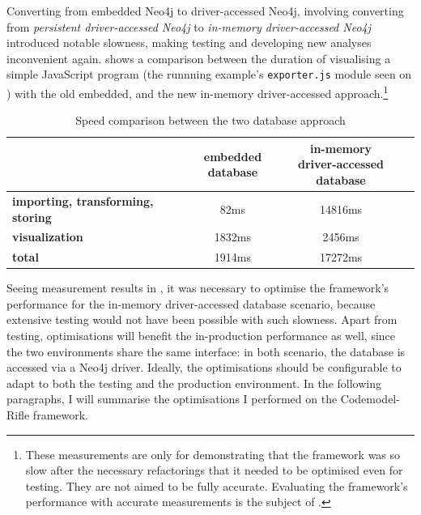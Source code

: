 Converting from embedded Neo4j to driver-accessed Neo4j, involving converting from \emph{persistent driver-accessed Neo4j} to \emph{in-memory driver-accessed Neo4j} introduced notable slowness, making testing and developing new analyses inconvenient again.  shows a comparison between the duration of visualising a simple JavaScript program (the runnning example's \texttt{exporter.js} module seen on ) with the old embedded, and the new in-memory driver-accessed approach.\footnote{These measurements are only for demonstrating that the framework was so slow after the necessary refactorings that it needed to be optimised even for testing. They are not aimed to be fully accurate. Evaluating the framework's performance with accurate measurements is the subject of .}

\begin{table}[!htb]
	\centering
	\begin{tabular}{l|cc}
		\toprule
																								& \shortstack{\textbf{embedded} \\ \textbf{database}}
																								& \shortstack{\textbf{in-memory} \\ \textbf{driver-accessed database}}
																								\\
		\midrule
		\textbf{importing, transforming, storing}   &   82ms     &   14816ms    \\
		\textbf{visualization}                      &   1832ms   &   2456ms    \\
		\midrule
		\textbf{total}                              &   1914ms   &   17272ms   \\
		\bottomrule
	\end{tabular}

	\caption{Speed comparison between the two database approach}
	\label{table:embedded-vs-in-memory-remote-table}
\end{table}

Seeing measurement results in , it was necessary to optimise the framework's performance for the in-memory driver-accessed database scenario, because extensive testing would not have been possible with such slowness. Apart from testing, optimisations will benefit the in-production performance as well, since the two environments share the same interface: in both scenario, the database is accessed via a Neo4j driver. Ideally, the optimisations should be configurable to adapt to both the testing and the production environment. In the following paragraphs, I will summarise the optimisations I performed on the Codemodel-Rifle framework.

